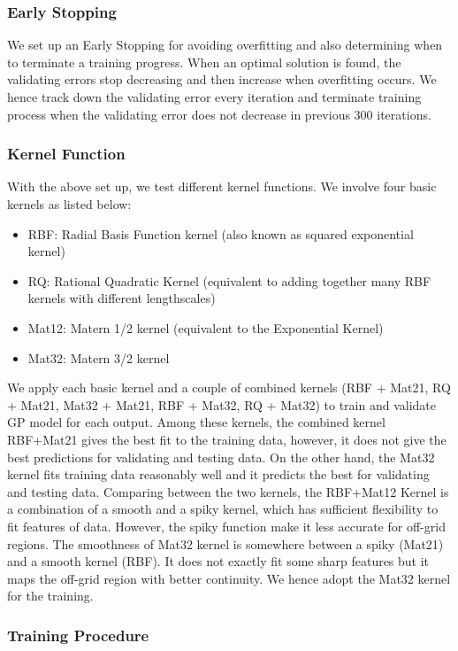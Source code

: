 \subsubsection{Early Stopping}

We set up an Early Stopping for avoiding overfitting and also determining when to terminate a training progress. 
When an optimal solution is found, the validating errors stop decreasing and then increase when overfitting occurs. 
We hence track down the validating error every iteration and terminate training process when the validating error does not decrease in previous 300 iterations. 	

\subsubsection{Kernel Function}

With the above set up, we test different kernel functions. We involve four basic kernels as listed below:
\begin{itemize}
\item RBF: Radial Basis Function kernel (also known as squared exponential kernel)
\item RQ: Rational Quadratic Kernel (equivalent to adding together many RBF kernels with different lengthscales)
\item Mat12: Matern 1/2 kernel (equivalent to the Exponential Kernel)
\item Mat32: Matern 3/2 kernel 
\end{itemize}
We apply each basic kernel and a couple of combined kernels (RBF + Mat21, RQ + Mat21, Mat32 + Mat21, RBF + Mat32, RQ + Mat32) to train and validate GP model for each output. Among these kernels, the combined kernel RBF+Mat21 gives the best fit to the training data, however, it does not give the best predictions for validating and testing data. On the other hand, the Mat32 kernel fits training data reasonably well and it predicts the best for validating and testing data. 
%
Comparing between the two kernels, the RBF+Mat12 Kernel is a combination of a smooth and a spiky kernel, which has sufficient flexibility to fit features of data. However, the spiky function make it less accurate for off-grid regions. 
%
The smoothness of Mat32 kernel is somewhere between a spiky (Mat21) and a smooth kernel (RBF). It does not exactly fit some sharp features but it maps the off-grid region with better continuity. We hence adopt the Mat32 kernel for the training. 

\subsubsection{Training Procedure}

